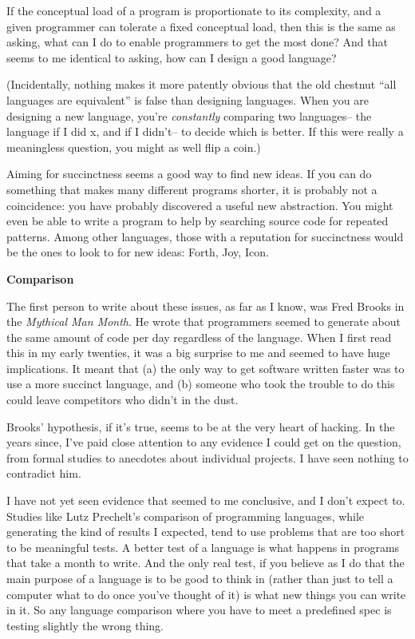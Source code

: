 If the conceptual load of a program is proportionate to its complexity,
and a given programmer can tolerate a fixed conceptual load, then this
is the same as asking, what can I do to enable programmers to get the
most done? And that seems to me identical to asking, how can I design a
good language?

(Incidentally, nothing makes it more patently obvious that the old
chestnut ``all languages are equivalent'' is false than designing
languages. When you are designing a new language, you're
\emph{constantly} comparing two languages-- the language if I did x, and
if I didn't-- to decide which is better. If this were really a
meaningless question, you might as well flip a coin.)

Aiming for succinctness seems a good way to find new ideas. If you can
do something that makes many different programs shorter, it is probably
not a coincidence: you have probably discovered a useful new
abstraction. You might even be able to write a program to help by
searching source code for repeated patterns. Among other languages,
those with a reputation for succinctness would be the ones to look to
for new ideas: Forth, Joy, Icon.

\textbf{Comparison}

The first person to write about these issues, as far as I know, was Fred
Brooks in the \emph{Mythical Man Month}. He wrote that programmers
seemed to generate about the same amount of code per day regardless of
the language. When I first read this in my early twenties, it was a big
surprise to me and seemed to have huge implications. It meant that (a)
the only way to get software written faster was to use a more succinct
language, and (b) someone who took the trouble to do this could leave
competitors who didn't in the dust.

Brooks' hypothesis, if it's true, seems to be at the very heart of
hacking. In the years since, I've paid close attention to any evidence I
could get on the question, from formal studies to anecdotes about
individual projects. I have seen nothing to contradict him.

I have not yet seen evidence that seemed to me conclusive, and I don't
expect to. Studies like Lutz Prechelt's comparison of programming
languages, while generating the kind of results I expected, tend to use
problems that are too short to be meaningful tests. A better test of a
language is what happens in programs that take a month to write. And the
only real test, if you believe as I do that the main purpose of a
language is to be good to think in (rather than just to tell a computer
what to do once you've thought of it) is what new things you can write
in it. So any language comparison where you have to meet a predefined
spec is testing slightly the wrong thing.

